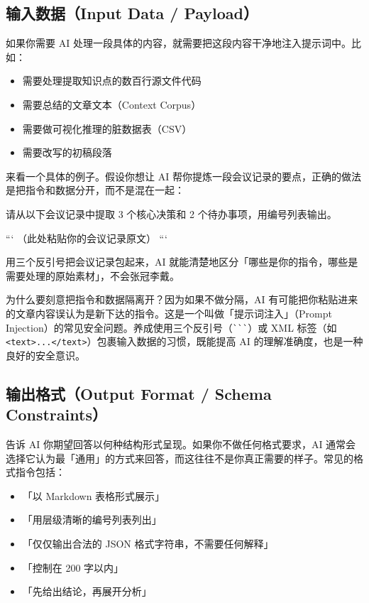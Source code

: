\subsection*{输入数据（Input Data / Payload）}

如果你需要 AI 处理一段具体的内容，就需要把这段内容干净地注入提示词中。比如：

\begin{itemize}
  \item 需要处理提取知识点的数百行源文件代码
  \item 需要总结的文章文本（Context Corpus）
  \item 需要做可视化推理的脏数据表（CSV）
  \item 需要改写的初稿段落
\end{itemize}

来看一个具体的例子。假设你想让 AI 帮你提炼一段会议记录的要点，正确的做法是把指令和数据分开，而不是混在一起：

\begin{promptbox}
请从以下会议记录中提取 3 个核心决策和 2 个待办事项，用编号列表输出。

```
（此处粘贴你的会议记录原文）
```
\end{promptbox}

用三个反引号把会议记录包起来，AI 就能清楚地区分「哪些是你的指令，哪些是需要处理的原始素材」，不会张冠李戴。

\begin{tipbox}
为什么要刻意把指令和数据隔离开？因为如果不做分隔，AI 有可能把你粘贴进来的文章内容误认为是新下达的指令。这是一个叫做「提示词注入」（Prompt Injection）的常见安全问题。养成使用三个反引号（\verb|```|）或 XML 标签（如 \verb|<text>...</text>|）包裹输入数据的习惯，既能提高 AI 的理解准确度，也是一种良好的安全意识。
\end{tipbox}

\subsection*{输出格式（Output Format / Schema Constraints）}

告诉 AI 你期望回答以何种结构形式呈现。如果你不做任何格式要求，AI 通常会选择它认为最「通用」的方式来回答，而这往往不是你真正需要的样子。常见的格式指令包括：

\begin{itemize}
  \item 「以 Markdown 表格形式展示」
  \item 「用层级清晰的编号列表列出」
  \item 「仅仅输出合法的 JSON 格式字符串，不需要任何解释」
  \item 「控制在 200 字以内」
  \item 「先给出结论，再展开分析」
\end{itemize}

